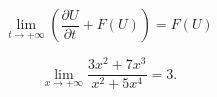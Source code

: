 \documentclass[11pt]{article}
\begin{document}
\[\lim_{t \to +\infty} \left(\frac{\partial U}{\partial t}+F(U)\right) = F(U)\]

\[ \lim_{x \to +\infty} \frac{3x^2 +7x^3}{x^2 +5x^4} = 3.\] 
\end{document}
